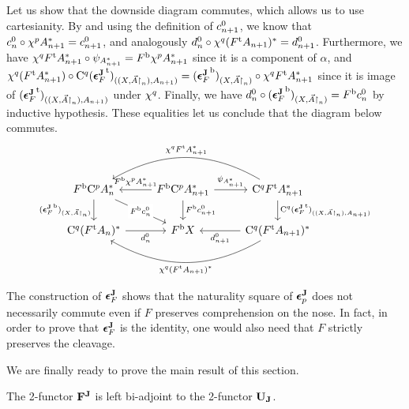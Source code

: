 \documentclass{lmcs} %
\theoremstyle{plain}\newtheorem{satz}[thm]{Satz} %
\begin{document}
			Let us show that the downside diagram commutes, which allows us to use cartesianity. By  and using the definition of $c^{0}_{n+1}$, we know that $c^{0}_{n}\circ \chi^{p}A_{n+1}^*=c^{0}_{n+1}$, and analogously $d^0_n\circ \chi^{q}({F}^{\mathrm{t}}A_{n+1})^*=d^0_{n+1}$.
			Furthermore, we have $\chi^{q}{F}^{\mathrm{t}}A_{n+1}^* \circ \psi_{A_{n+1}^*} = {F}^{\mathrm{b}}\chi^{p}A_{n+1}^*$ since it is a component of $\alpha$, and $\chi^{q}({F}^{\mathrm{t}}A_{n+1}^*) \circ \mathrm{C}^{q}({\boldsymbol{\epsilon}^{\mathbf{J}}_{F}}^{\mathrm{t}})_{((X,\vec{A}\mathord{\restriction}_n),A_{n+1})} = ({\boldsymbol{\epsilon}^{\mathbf{J}}_{F}}^{\mathrm{b}})_{(X,\vec{A}\mathord{\restriction}_n)} \circ \chi^{q}{F}^{\mathrm{t}}A_{n+1}^*$ since it is image of $({\boldsymbol{\epsilon}^{\mathbf{J}}_{F}}^{\mathrm{t}})_{((X,\vec{A}\mathord{\restriction}_n),A_{n+1})}$ under $\chi^{q}$.
			Finally, we have $d^0_n\circ({\boldsymbol{\epsilon}^{\mathbf{J}}_{F}}^{\mathrm{b}})_{(X,\vec{A}\mathord{\restriction}_n)}={F}^{\mathrm{b}}c^{0}_{n}$ by inductive hypothesis. These equalities let us conclude that the diagram below commutes.
			\[\begin{tikzcd}
				{\fb{F}\comp{p}A_n^*} & {\fb{F}\comp{p}A_{n+1}^*} & {\comp{q}\ft{F}A_{n+1}^*} \\
				{\comp{q}(\ft{F}A_n)^*} & {\fb{F}X} & {\comp{q}(\ft{F}A_{n+1})^*}
				\arrow["{(\fb{\Jcoun{F}})_{(X,\vec{A}\rstn_n)}}"', from=1-1, to=2-1]
				\arrow["{\fb{F}\C{0}{n}}"{description}, from=1-1, to=2-2]
				\arrow["{\fb{F}\jcomp{p}A_{n+1}^*}"', from=1-2, to=1-1]
				\arrow["{\psi_{A_{n+1}^*}}", from=1-2, to=1-3]
				\arrow["{\fb{F}\C{0}{n+1}}", from=1-2, to=2-2]
				\arrow["{\jcomp{q}\ft{F}A_{n+1}^*}"', bend right, from=1-3, to=1-1]
				\arrow["{\comp{q}(\ft{\Jcoun{F}})_{((X,\vec{A}\rstn_n),A_{n+1})}}", from=1-3, to=2-3]
				\arrow["{d^0_n}"', from=2-1, to=2-2]
				\arrow["{\jcomp{q}(\ft{F}A_{n+1})^*}", bend left, from=2-3, to=2-1]
				\arrow["{d^0_{n+1}}", from=2-3, to=2-2]
			\end{tikzcd}\]

\begin{rem}
	The construction of $\boldsymbol{\epsilon}^{\mathbf{J}}_{F}$ shows that the naturality square of $\boldsymbol{\epsilon}^{\mathbf{J}}_{p}$ does not necessarily commute even if $F$ preserves comprehension on the nose. In fact, in order to prove that $\boldsymbol{\epsilon}^{\mathbf{J}}_{F}$ is the identity, one would also need that $F$ strictly preserves the cleavage.
\end{rem}

We are finally ready to prove the main result of this section.			
			
			\begin{thm}\label{thm:jfree}
				The 2-functor $\mathbf{F^J}$ is left bi-adjoint to the 2-functor $\mathbf{U_J}$.
			\end{thm}
			
\end{document}
